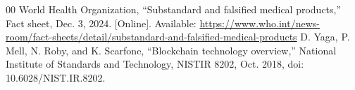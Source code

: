 \documentclass[conference]{IEEEtran}
\begin{document}
\begin{thebibliography}{00}
 World Health Organization, “Substandard and falsified medical products,” Fact sheet, Dec. 3, 2024. [Online]. Available: \url{https://www.who.int/news-room/fact-sheets/detail/substandard-and-falsified-medical-products}
 D. Yaga, P. Mell, N. Roby, and K. Scarfone, “Blockchain technology overview,” National Institute of Standards and Technology, NISTIR 8202, Oct. 2018, doi: 10.6028/NIST.IR.8202.
\end{thebibliography}
\end{document}
